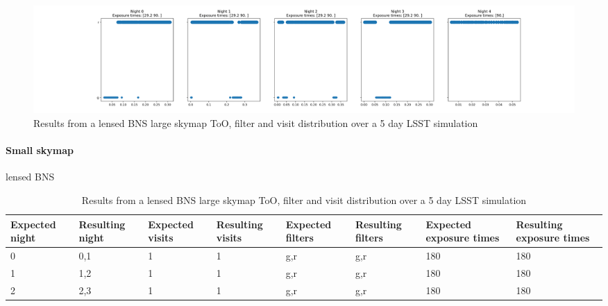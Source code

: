 \begin{figure}[h!]
    \centering
    \includegraphics[width=\linewidth]{figures/validationTests/SVRequired/LensedBNSAFilterPlot.png}
    \caption{Results from a lensed BNS large skymap ToO, filter and visit distribution over a 5 day LSST simulation}
    \label{fig:LensedBNSAFilterResult}
\end{figure}
\clearpage

\paragraph{Small skymap} lensed BNS

\begin{table}[h!]
\centering
\begin{adjustbox}{max width=\linewidth}
\begin{tabular}{|l|l|l|l|l|l|l|l|}
\hline
Expected night & Resulting night & Expected visits & Resulting visits & Expected filters & Resulting filters & Expected exposure times & Resulting exposure times \\ \hline
0              & 0,1             & 1               & 1                & g,r              & g,r               & 180                     & 180                      \\ \hline
1              & 1,2             & 1               & 1                & g,r              & g,r               & 180                     & 180                      \\ \hline
2              & 2,3             & 1               & 1                & g,r              & g,r               & 180                     & 180                      \\ \hline
\end{tabular}
\end{adjustbox}
\caption{Results from a lensed BNS large skymap ToO, filter and visit distribution over a 5 day LSST simulation}
\label{tab:LensedBNSBResults}
\end{table}

